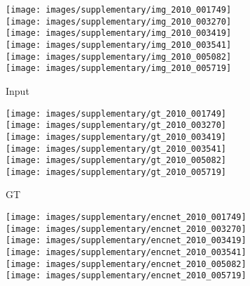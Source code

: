 \documentclass[10pt,twocolumn,letterpaper]{article}
\begin{document}
\begin{figure*}[!htb] 
\begin{center}
	\begin{subfigure}[b]{0.24\linewidth}
		\texttt{[image: images/supplementary/img\_2010\_001749]}\\
		\texttt{[image: images/supplementary/img\_2010\_003270]}\\
		\texttt{[image: images/supplementary/img\_2010\_003419]}\\
		\texttt{[image: images/supplementary/img\_2010\_003541]}\\
		\texttt{[image: images/supplementary/img\_2010\_005082]}\\
		\texttt{[image: images/supplementary/img\_2010\_005719]}\\
		\caption{Input}
    \end{subfigure}
    \hfill
	\begin{subfigure}[b]{0.24\linewidth}
		\texttt{[image: images/supplementary/gt\_2010\_001749]}\\
		\texttt{[image: images/supplementary/gt\_2010\_003270]}\\
		\texttt{[image: images/supplementary/gt\_2010\_003419]}\\
		\texttt{[image: images/supplementary/gt\_2010\_003541]}\\
		\texttt{[image: images/supplementary/gt\_2010\_005082]}\\
		\texttt{[image: images/supplementary/gt\_2010\_005719]}\\
		\caption{GT}
    \end{subfigure}
    \hfill
	\begin{subfigure}[b]{0.24\linewidth}
		\texttt{[image: images/supplementary/encnet\_2010\_001749]}\\
		\texttt{[image: images/supplementary/encnet\_2010\_003270]}\\
		\texttt{[image: images/supplementary/encnet\_2010\_003419]}\\
		\texttt{[image: images/supplementary/encnet\_2010\_003541]}\\
		\texttt{[image: images/supplementary/encnet\_2010\_005082]}\\
		\texttt{[image: images/supplementary/encnet\_2010\_005719]}\\

\end{subfigure}
\end{center}
\end{figure*}
\end{document}
